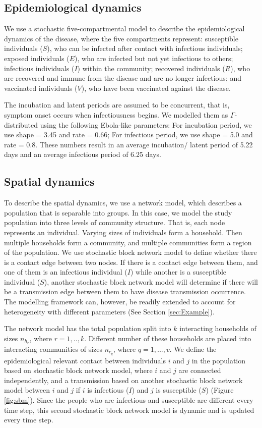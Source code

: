 \documentclass[a4paper]{article}
\begin{document}
	\subsection{Epidemiological dynamics}
	We use a stochastic five-compartmental model to describe the epidemiological dynamics of the disease, where the five compartments represent: susceptible individuals ($S$), who can be infected after contact with infectious individuals; exposed individuals ($E$), who are infected but not yet infectious to others; infectious individuals ($I$) within the community; recovered individuals ($R$), who are recovered and immune from the disease and are no longer infectious; and vaccinated individuals ($V$), who have been vaccinated against the disease.
	
	The incubation and latent periods are assumed to be concurrent, that is, symptom onset occurs when infectiousness begins. We modelled them as $\Gamma$-distributed using the following Ebola-like parameters\cite{Hitchings2018AmJEpi}: For incubation period, we use shape = 3.45 and rate = 0.66; For infectious period, we use shape = 5.0 and rate = 0.8. These numbers result in an average incubation/ latent period of 5.22 days and an average infectious period of 6.25 days.
	
	\subsection{Spatial dynamics}
	To describe the spatial dynamics, we use a network model, which describes a population that is separable into groups. In this case, we model the study population into three levels of community structure. That is, each node represents an individual. Varying sizes of individuals form a household. Then multiple households form a community, and multiple communities form a region of the population. We use stochastic block network model to define whether there is a contact edge between two nodes. If there is a contact edge between them, and one of them is an infectious individual ($I$) while another is a susceptible individual ($S$), another stochastic block network model will determine if there will be a transmission edge between them to have disease transmission occurrence. The modelling framework can, however, be readily extended to account for heterogeneity with different parameters (See Section \ref{sec:Example}).
	
	The network model has the total population split into $k$ interacting households of sizes $n_{h_r}$, where $r = 1,..,k$. Different number of these households are placed into interacting communities of sizes $n_{c_q}$, where $q = 1,...,v$. We define the epidemiological relevant contact between individuals $i$ and $j$ in the population based on stochastic block network model\cite{Hitchings2018AmJEpi, Karrer2011arXiv}, where $i$ and $j$ are connected independently, and a transmission based on another stochastic block network model between $i$ and $j$ if $i$ is infectious ($I$) and $j$ is susceptible ($S$) (Figure \ref{fig:sbm}). Since the people who are infectious and susceptible are different every time step, this second stochastic block network model is dynamic and is updated every time step.
	
\end{document}
